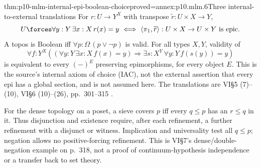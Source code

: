 \begin{hbtheorem}{thm:p10-mlm-internal-epi-boolean-choice}{proved=annex:p10.mlm.6}{Three internal-to-external translations}
For \(r:U\to Y^X\) with transpose \(\widetilde r:U\times X\to Y\),
\[
 U\forces\forall y:Y\,\exists x:X\,r(x)=y
 \ \Longleftrightarrow\
 \langle\pi_1,\widetilde r\rangle:U\times X\to U\times Y\text{ is epic}.
\]
A topos is Boolean iff \(\forall p:\Omega\,(p\vee\neg p)\) is valid.
For all types \(X,Y\), validity of
\[
 \forall f:Y^X\left((\forall y:Y\,\exists x:X\,f(x)=y)
       \Rightarrow\exists s:X^Y\,\forall y:Y\,f(s(y))=y\right)
\]
is equivalent to every \((-)^E\) preserving epimorphisms, for every object
\(E\). This is the source's internal axiom of choice (IAC), not the external
assertion that every epi has a global section, and is not assumed here.
The translations are VI\S5 (7)--(10), VI\S6 (10)--(26), pp.~301--315
\cite{MacLaneMoerdijk1992}.
\end{hbtheorem}

For the dense topology on a poset, a sieve covers \(p\) iff every \(q\leq p\)
has an \(r\leq q\) in it. Thus disjunction and existence require, after
each refinement, a further refinement with a disjunct or witness.
Implication and universality test all \(q\leq p\); negation allows no
positive-forcing refinement. This is VI\S7's dense/double-negation example
on p.~318, not a proof of continuum-hypothesis independence or a transfer
back to set theory.
